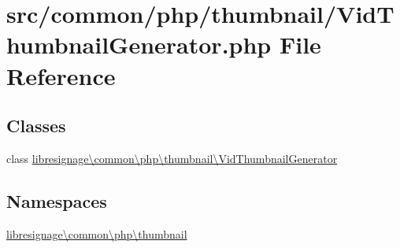\hypertarget{VidThumbnailGenerator_8php}{}\section{src/common/php/thumbnail/\+Vid\+Thumbnail\+Generator.php File Reference}
\label{VidThumbnailGenerator_8php}
\subsection*{Classes}
\begin{DoxyCompactItemize}
\item 
class \hyperlink{classlibresignage_1_1common_1_1php_1_1thumbnail_1_1VidThumbnailGenerator}{libresignage\textbackslash{}common\textbackslash{}php\textbackslash{}thumbnail\textbackslash{}\+Vid\+Thumbnail\+Generator}
\end{DoxyCompactItemize}
\subsection*{Namespaces}
\begin{DoxyCompactItemize}
\item 
 \hyperlink{namespacelibresignage_1_1common_1_1php_1_1thumbnail}{libresignage\textbackslash{}common\textbackslash{}php\textbackslash{}thumbnail}
\end{DoxyCompactItemize}
